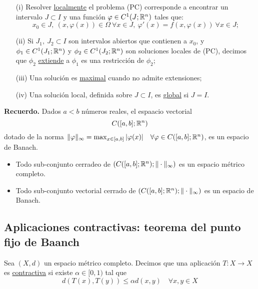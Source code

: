 \documentclass[a4paper]{report}
\begin{document}
\begin{enumerate}
	\item[(i)] Resolver \underline{localmente} el problema (PC) corresponde a encontrar un intervalo $J \subset I$ y una función $\varphi \in C^1 (J;\mathbb{R}^n)$ tales que:
	\[ x_0 \in J,\ (x,\varphi(x)) \in \Omega \ \forall x \in J,\ \varphi'(x) = f(x,\varphi(x))\ \forall x \in J; \]

	\item[(ii)] Si $J_1,\ J_2 \subset I$ son intervalos abiertos que contienen a $x_0$, y $\phi_1 \in C^1(J_1;\mathbb{R}^n)$ y $\phi_2 \in C^1(J_2; \mathbb{R}^n)$ son soluciones locales de (PC), decimos que $\phi_2$ \underline{extiende} a $\phi_{1}$ es una restricción de $\phi_{2}$;

	\item[(iii)] Una solución es \underline{maximal} cuando no admite extensiones;

	\item[(iv)] Una solución local, definida sobre $J \subset I$, es \underline{global} si $J = I$.
\end{enumerate}

\noindent \textbf{Recuerdo.} Dados $a<b$ números reales, el espaacio vectorial
\[ C([a,b];\mathbb{R}^n) \]
\noindent dotado de la norma $\| \varphi \|_{\infty} = \max_{x \in [a,b]} |\varphi(x)| \quad \forall \varphi \in C([a,b];\mathbb{R}^n)$, es un espacio de Banach.

\begin{itemize}
	\item Todo sub-conjunto cerradeo de $(C([a,b];\mathbb{R}^n);\| \cdot \|_{\infty})$ es un espacio métrico completo.

	\item Todo sub-conjunto vectorial cerrado de $(C([a,b];\mathbb{R}^n);\| \cdot \|_{\infty})$ es un espacio de Banach.
\end{itemize}


\subsection{Aplicaciones contractivas: teorema del punto fijo de Baanch}

\begin{definition}
	Sea $(X,d)$ un espacio métrico completo. Decimos que una aplicación $T: X \to X$ es \underline{contractiva} si existe $\alpha \in [0,1)$ tal que
	\[ d(T(x),T(y)) \leq \alpha d(x,y) \quad \forall x,y \in X \]
\end{definition}
\end{document}
